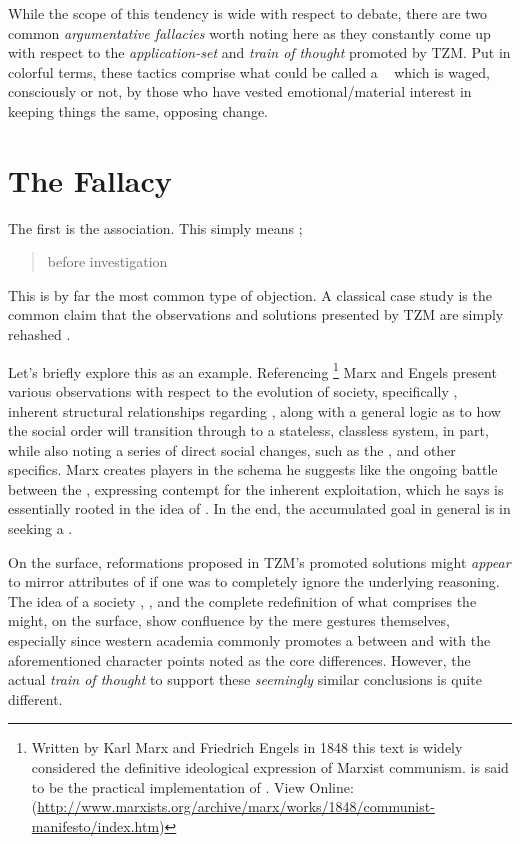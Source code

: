 \documentclass[10pt, a4paper, cleardoubleempty, openright, twoside]{book}
\begin{document}
While the scope of this tendency is wide with respect to debate, there
are two common \emph{argumentative fallacies} worth noting here as they
constantly come up with respect to the \emph{application-set} and
\emph{train of thought} promoted by TZM. Put in colorful terms, these
tactics comprise what could be called a ~\cite{McMurtry::02} which is waged, consciously or not, by those
who have vested emotional/material interest in keeping things the same,
opposing change.

\section {The  Fallacy}

The first is the  association. This simply means
;
\blockcquote{Dictionary:http:14b}{before investigation}. This is by far
the most common type of objection. A classical case study is the common
claim that the observations and solutions presented by TZM are simply
rehashed .

Let's briefly explore this as an example. Referencing \footnote{
	Written by Karl Marx and Friedrich Engels in 1848 this text is widely
	considered the definitive ideological expression of Marxist communism.
	 is said to be the practical implementation of
	. View Online:
	(\url{http://www.marxists.org/archive/marx/works/1848/communist-manifesto/index.htm})
} 
Marx and Engels present various observations with respect to the
evolution of society, specifically , inherent
structural relationships regarding , along with a
general logic as to how the social order will transition through
 to a stateless, classless system, in part, while
also noting a series of direct social changes, such as the
, 
and other specifics. Marx creates players in the schema he suggests like
the ongoing battle between the ,
expressing contempt for the inherent exploitation, which he says is
essentially rooted in the idea of . In the
end, the accumulated goal in general is in seeking a
.

On the surface, reformations proposed in TZM's promoted solutions might
\emph{appear} to mirror attributes of  if one was to
completely ignore the underlying reasoning. The idea of a society
, , and
the complete redefinition of what comprises the  might,
on the surface, show confluence by the mere gestures themselves,
especially since western academia commonly promotes a
 between  and
 with the aforementioned character points noted as
the core differences. However, the actual \emph{train of thought} to
support these \emph{seemingly} similar conclusions is quite different.
\end{document}
